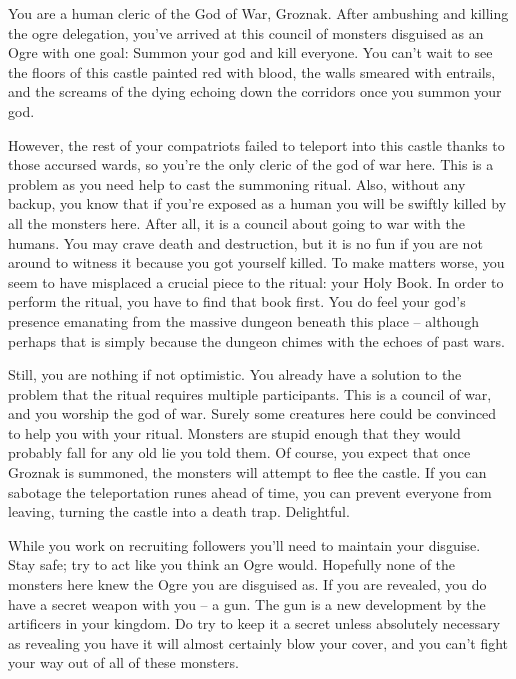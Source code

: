 \documentclass[char]{guildcamp2}
\begin{document}
\name{\cCleric{}}


You are a human cleric of the God of War, Groznak. After ambushing and killing the ogre delegation, you've arrived at this council of monsters disguised as an Ogre with one goal: Summon your god and kill everyone. You can't wait to see the floors of this castle painted red with blood, the walls smeared with entrails, and the screams of the dying echoing down the corridors once you summon your god. 

However, the rest of your compatriots failed to teleport into this castle thanks to those accursed wards, so you're the only cleric of the god of war here. This is a problem as you need help to cast the summoning ritual. Also, without any backup, you know that if you're exposed as a human you will be swiftly killed by all the monsters here. After all, it is a council about going to war with the humans. You may crave death and destruction, but it is no fun if you are not around to witness it because you got yourself killed. To make matters worse, you seem to have misplaced a crucial piece to the ritual: your Holy Book. In order to perform the ritual, you have to find that book first. You do feel your god's presence emanating from the massive dungeon beneath this place -- although perhaps that is simply because the dungeon chimes with the echoes of past wars.
		
Still, you are nothing if not optimistic. You already have a solution to the problem that the ritual requires multiple participants. This is a council of war, and you worship the god of war. Surely some creatures here could be convinced to help you with your ritual. Monsters are stupid enough that they would probably fall for any old lie you told them. Of course, you expect that once Groznak is summoned, the monsters will attempt to flee the castle. If you can sabotage the teleportation runes ahead of time, you can prevent everyone from leaving, turning the castle into a death trap. Delightful.
	
While you work on recruiting followers you'll need to maintain your disguise. Stay safe; try to act like you think an Ogre would. Hopefully none of the monsters here knew the Ogre you are disguised as. If you are revealed, you do have a secret weapon with you -- a gun. The gun is a new development by the artificers in your kingdom. Do try to keep it a secret unless absolutely necessary as revealing you have it will almost certainly blow your cover, and you can't fight your way out of all of these monsters.
\end{document}
